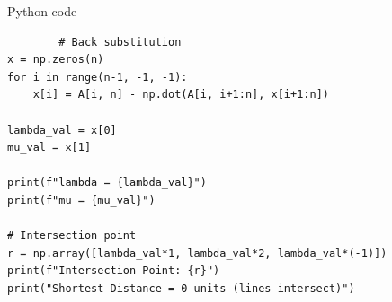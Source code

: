 \documentclass{beamer}
\begin{document}
\begin{frame}[fragile]{Python code}
    \begin{lstlisting}
        # Back substitution
x = np.zeros(n)
for i in range(n-1, -1, -1):
    x[i] = A[i, n] - np.dot(A[i, i+1:n], x[i+1:n])

lambda_val = x[0]
mu_val = x[1]

print(f"lambda = {lambda_val}")
print(f"mu = {mu_val}")

# Intersection point
r = np.array([lambda_val*1, lambda_val*2, lambda_val*(-1)])
print(f"Intersection Point: {r}")
print("Shortest Distance = 0 units (lines intersect)")
    \end{lstlisting}
\end{frame}
\end{document}
